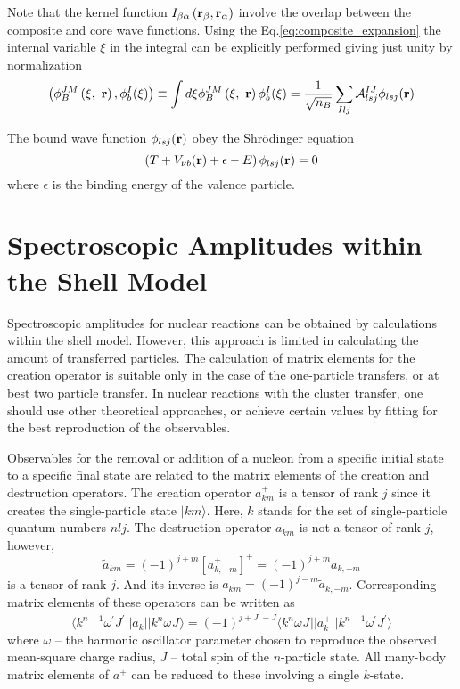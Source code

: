 \documentclass[
12pt, %
oneside, %
english, %
onehalfspacing, %
onehalfspacing, %
headsepline, %
]{MastersDoctoralThesis} %
\begin{document}
Note that the kernel function $I_{\beta \alpha}   \left( {\bf r}_\beta ,  {\bf r}_\alpha \right)  $ involve the overlap between the composite and core wave functions. 
Using the Eq.\ref{eq:composite_expansion} the internal variable $\xi$ in the integral can be explicitly performed giving just unity by normalization
\begin{equation}
\left( \phi^{JM}_B \left( \xi,~{\bf r} \right), \phi_b^I ( \xi ) \right)
\equiv 
\int d \xi \phi^{JM}_B \left( \xi,~{\bf r} \right)  \phi_b^I ( \xi ) = 
\frac{1}{\sqrt{n_B}}
 \sum_{Ilj} \mathcal{A}_{lsj}^{IJ}  \phi_{lsj} ({\bf r})
\end{equation}
 
 The bound wave function $ \phi_{lsj} ({\bf r})$ obey the Shr\"{o}dinger equation 
 \begin{equation}
 \left( T + V_{\nu b} ({\bf r}) + \epsilon - E \right) \phi_{lsj} ({\bf r}) = 0
 \end{equation}
 where $\epsilon$ is the binding energy of the valence particle.
 
 
 
\section{Spectroscopic Amplitudes within the Shell Model}
Spectroscopic amplitudes for nuclear reactions can be obtained by calculations within the shell model. However, this approach is limited in calculating the amount of transferred particles. The calculation of matrix elements for the creation operator is suitable only in the case of the one-particle transfers, or at best two particle transfer. In nuclear reactions with the cluster transfer, one should use other theoretical approaches, or achieve certain values by fitting for the best reproduction of the observables.

Observables for the removal or addition of a nucleon from a specific initial state to a
specific final state are related to the matrix elements of the creation and destruction
operators.
The creation operator $a^+_{km}$ is a tensor of rank $j$ since it creates the single-particle state $\vert km \rangle$. Here, $k$ stands for the set of single-particle quantum numbers $nlj$.
 The destruction operator $a_{km}$ is not a tensor of rank $j$, however,
 \begin{equation}
 \tilde{a}_{km}=(-1)^{j+m} \left[ a^+_{k,-m} \right]^+ =
 (-1)^{j+m} a_{k,-m}
 \end{equation}
is a tensor of rank $j$. And its inverse is $ a_{km}=(-1)^{j-m}\tilde{a}_{k,-m}$. 
Corresponding matrix elements of these operators can be written as
\begin{equation}
\langle
 k^{n-1} \omega^{\prime} J^{\prime}
\vert \vert
\tilde{a}_k
 \vert \vert
 k^{n} \omega^{} J^{}
  \rangle 
  = 
  (-1)^{j+J^{\prime}-J}
  \langle
  k^{n} \omega^{} J^{}
\vert \vert
{a}^{+}_k
 \vert \vert
 k^{n-1} \omega^{\prime} J^{\prime}
  \rangle 
  \label{matrix_elements_of_sa}
\end{equation}
where $\omega$ -- the harmonic oscillator parameter chosen to reproduce the observed mean-square charge radius, $J$ -- total spin of the $n$-particle state.
All many-body matrix elements of $a^+$ can be reduced to these involving a single
$k$-state.
\end{document}

